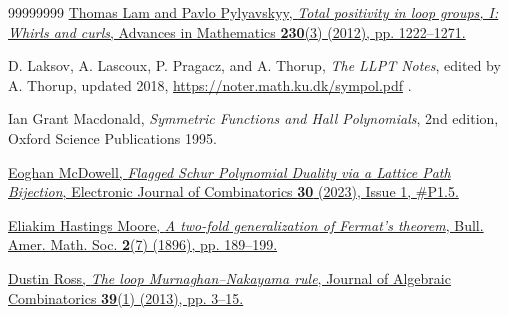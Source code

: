 \documentclass[numbers=enddot,12pt,final,onecolumn,notitlepage]{scrartcl}%
\theoremstyle{definition}
\begin{document}
\begin{thebibliography}{99999999}
%
\href{https://doi.org/10.1016/j.aim.2012.03.012}{Thomas Lam and Pavlo
Pylyavskyy, \textit{Total positivity in loop groups, I: Whirls and curls},
Advances in Mathematics \textbf{230}(3) (2012), pp. 1222--1271.}

D. Laksov, A. Lascoux, P. Pragacz, and A. Thorup,
\textit{The LLPT Notes}, edited by A. Thorup, updated 2018,\newline%
\url{https://noter.math.ku.dk/sympol.pdf} .

Ian Grant Macdonald, \textit{Symmetric Functions
and Hall Polynomials}, 2nd edition, Oxford Science Publications 1995.

\href{https://doi.org/10.37236/11200}{Eoghan
McDowell, \textit{Flagged Schur Polynomial Duality via a Lattice Path
Bijection}, Electronic Journal of Combinatorics \textbf{30} (2023), Issue 1,
\#P1.5.}

%
\href{https://projecteuclid.org/journals/bulletin-of-the-american-mathematical-society/volume-2/issue-7/A-two-fold-generalization-of-Fermats-theorem/bams/1183414614.full}{Eliakim
Hastings Moore, \textit{A two-fold generalization of Fermat's theorem}, Bull.
Amer. Math. Soc. \textbf{2}(7) (1896), pp. 189--199.}

%
\href{https://doi.org/10.1007/s10801-013-0436-y}{Dustin Ross, \textit{The loop
Murnaghan--Nakayama rule}, Journal of Algebraic Combinatorics \textbf{39}(1)
(2013), pp. 3--15.}
\end{thebibliography}
\end{document}
